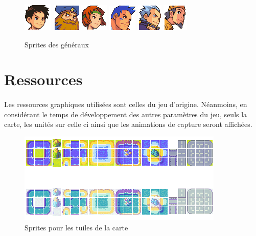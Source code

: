 \documentclass[12pt]{report}
\begin{document}
        \begin{figure}[h]
    \begin{center}
    \includegraphics{advance_wars_sprites_andy.png}
    \includegraphics{advance_wars_sprites_olaf.png}
    \includegraphics{advance_wars_sprites_sami.png}
    \includegraphics{advance_wars_sprites_max.png}
    \includegraphics{advance_wars_sprites_eagle.png}
    \includegraphics{advance_wars_sprites_gritt.png}
    \end{center}
    \caption{Sprites des généraux}
    \end{figure}
    
    \section{Ressources}
    \paragraph{}Les ressources graphiques utilisées sont celles du jeu d'origine. Néanmoins, en considérant le temps de développement des autres paramètres du jeu, seuls la carte, les unités sur celle ci ainsi que les animations de capture seront affichées.
    
    \begin{figure}[h]
    \begin{center}
    \includegraphics{advance_wars_sprites_map_tiles.png}
    \end{center}
    \caption{Sprites pour les tuiles de la carte}
    \end{figure}
    
\end{document}
